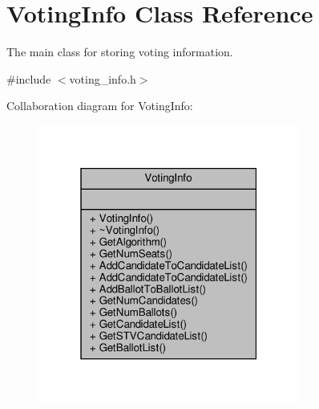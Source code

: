 \hypertarget{classVotingInfo}{}\section{Voting\+Info Class Reference}
\label{classVotingInfo}


The main class for storing voting information.  




{\ttfamily \#include $<$voting\+\_\+info.\+h$>$}



Collaboration diagram for Voting\+Info\+:\nopagebreak
\begin{figure}[H]
\begin{center}
\leavevmode
\includegraphics[width=244pt]{classVotingInfo__coll__graph}
\end{center}
\end{figure}
